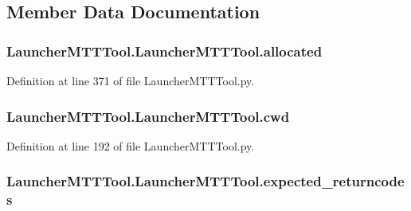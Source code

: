 \subsection{Member Data Documentation}
\hypertarget{class_launcher_m_t_t_tool_1_1_launcher_m_t_t_tool_a79266b94da58ec136cca44c1f735d3a7}{
\subsubsection[{allocated}]{\setlength{\rightskip}{0pt plus 5cm}Launcher\-M\-T\-T\-Tool.\-Launcher\-M\-T\-T\-Tool.\-allocated}}\label{class_launcher_m_t_t_tool_1_1_launcher_m_t_t_tool_a79266b94da58ec136cca44c1f735d3a7}


Definition at line 371 of file Launcher\-M\-T\-T\-Tool.\-py.

\hypertarget{class_launcher_m_t_t_tool_1_1_launcher_m_t_t_tool_a7bcf1056b03f3777ef4ed39f7e063f36}{
\subsubsection[{cwd}]{\setlength{\rightskip}{0pt plus 5cm}Launcher\-M\-T\-T\-Tool.\-Launcher\-M\-T\-T\-Tool.\-cwd}}\label{class_launcher_m_t_t_tool_1_1_launcher_m_t_t_tool_a7bcf1056b03f3777ef4ed39f7e063f36}


Definition at line 192 of file Launcher\-M\-T\-T\-Tool.\-py.

\hypertarget{class_launcher_m_t_t_tool_1_1_launcher_m_t_t_tool_ae68abb344ae827a5ce0ee79446020c63}{
\subsubsection[{expected\-\_\-returncodes}]{\setlength{\rightskip}{0pt plus 5cm}Launcher\-M\-T\-T\-Tool.\-Launcher\-M\-T\-T\-Tool.\-expected\-\_\-returncodes}}\label{class_launcher_m_t_t_tool_1_1_launcher_m_t_t_tool_ae68abb344ae827a5ce0ee79446020c63}


